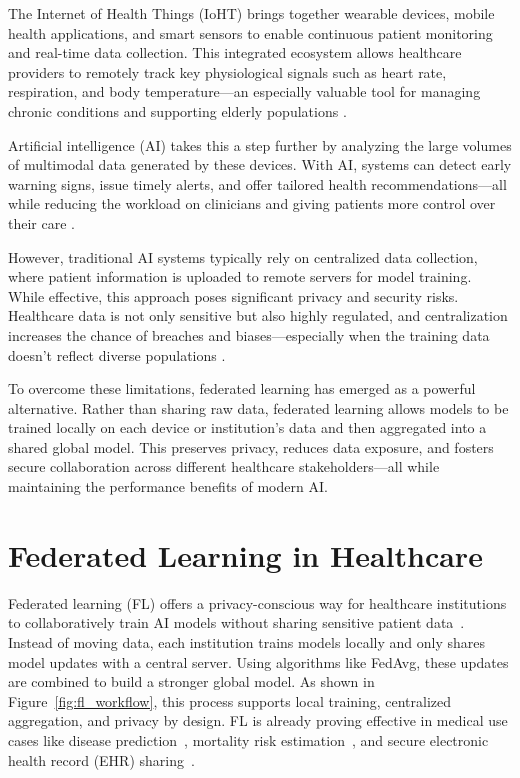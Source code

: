 The Internet of Health Things (IoHT) brings together wearable devices, mobile health applications, and smart sensors to enable continuous patient monitoring and real-time data collection. This integrated ecosystem allows healthcare providers to remotely track key physiological signals such as heart rate, respiration, and body temperature—an especially valuable tool for managing chronic conditions and supporting elderly populations \cite{alshamrani2022iot, qian2021artificial}.

Artificial intelligence (AI) takes this a step further by analyzing the large volumes of multimodal data generated by these devices. With AI, systems can detect early warning signs, issue timely alerts, and offer tailored health recommendations—all while reducing the workload on clinicians and giving patients more control over their care \cite{qian2021can}.

However, traditional AI systems typically rely on centralized data collection, where patient information is uploaded to remote servers for model training. While effective, this approach poses significant privacy and security risks. Healthcare data is not only sensitive but also highly regulated, and centralization increases the chance of breaches and biases—especially when the training data doesn’t reflect diverse populations \cite{xu2021federated}.

To overcome these limitations, federated learning has emerged as a powerful alternative. Rather than sharing raw data, federated learning allows models to be trained locally on each device or institution’s data and then aggregated into a shared global model. This preserves privacy, reduces data exposure, and fosters secure collaboration across different healthcare stakeholders—all while maintaining the performance benefits of modern AI.


\section{Federated Learning in Healthcare}
Federated learning (FL) offers a privacy-conscious way for healthcare institutions to collaboratively train AI models without sharing sensitive patient data~\cite{mcmahan2017communication}. Instead of moving data, each institution trains models locally and only shares model updates with a central server. Using algorithms like FedAvg, these updates are combined to build a stronger global model. As shown in Figure~\ref{fig:fl_workflow}, this process supports local training, centralized aggregation, and privacy by design. FL is already proving effective in medical use cases like disease prediction~\cite{xu2021federated}, mortality risk estimation~\cite{huang2019patient}, and secure electronic health record (EHR) sharing~\cite{brisimi2018federated, tramel2019federated}.

